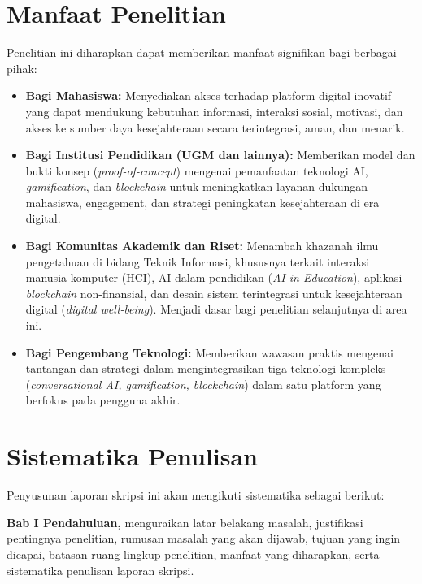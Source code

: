 
\section{Manfaat Penelitian}
\label{sec:manfaat_penelitian}

Penelitian ini diharapkan dapat memberikan manfaat signifikan bagi berbagai pihak:

\begin{itemize}
    \item \textbf{Bagi Mahasiswa:} Menyediakan akses terhadap platform digital inovatif yang dapat mendukung kebutuhan informasi, interaksi sosial, motivasi, dan akses ke sumber daya kesejahteraan secara terintegrasi, aman, dan menarik.
    \item \textbf{Bagi Institusi Pendidikan (UGM dan lainnya):} Memberikan model dan bukti konsep (\textit{proof-of-concept}) mengenai pemanfaatan teknologi AI, \textit{gamification}, dan \textit{blockchain} untuk meningkatkan layanan dukungan mahasiswa, engagement, dan strategi peningkatan kesejahteraan di era digital.
    \item \textbf{Bagi Komunitas Akademik dan Riset:} Menambah khazanah ilmu pengetahuan di bidang Teknik Informasi, khususnya terkait interaksi manusia-komputer (HCI), AI dalam pendidikan (\textit{AI in Education}), aplikasi \textit{blockchain} non-finansial, dan desain sistem terintegrasi untuk kesejahteraan digital (\textit{digital well-being}). Menjadi dasar bagi penelitian selanjutnya di area ini.
    \item \textbf{Bagi Pengembang Teknologi:} Memberikan wawasan praktis mengenai tantangan dan strategi dalam mengintegrasikan tiga teknologi kompleks (\textit{conversational AI, gamification, blockchain}) dalam satu platform yang berfokus pada pengguna akhir.
\end{itemize}


\section{Sistematika Penulisan}
\label{sec:sistematika_penulisan}

Penyusunan laporan skripsi ini akan mengikuti sistematika sebagai berikut:

\textbf{Bab I Pendahuluan,} menguraikan latar belakang masalah, justifikasi pentingnya penelitian, rumusan masalah yang akan dijawab, tujuan yang ingin dicapai, batasan ruang lingkup penelitian, manfaat yang diharapkan, serta sistematika penulisan laporan skripsi.


